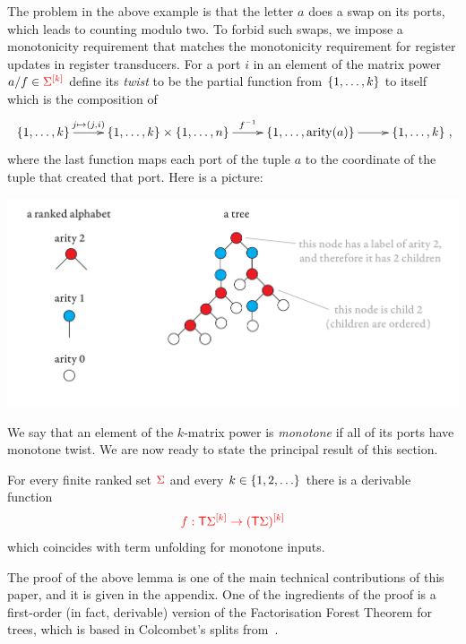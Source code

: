 The problem in the above example is that the letter $a$ does a swap on its ports, which leads to counting modulo two. To forbid such swaps, we impose a monotonicity requirement that matches the monotonicity requirement for register updates in register transducers.
For a port $i$ in an element of the matrix power $a/f \in \mati k \rSigma$ define its \emph{twist} to be the partial function from $\set{1,\ldots,k}$ to itself 
which is the composition of 
\begin{align*}
\xymatrix{
    \set{1,\ldots,k} \ar[r]^-{j \mapsto {(j,i)}} & \set{1,\ldots,k} \times \set{1,\ldots,n} \ar[r]^-{f^{-1}} & \set{1,\ldots,\arity a} \ar[r] & \set{1,\ldots,k}
},
\end{align*}
where the last function maps each port of the tuple $a$ to the coordinate of the tuple that created that port. Here is a picture:
\begin{center}
\includegraphics[scale=.3, page=87]{pics.pdf}
\end{center}
 We say that an element of the $k$-matrix power is \emph{monotone} if all of its ports have monotone twist.
 We are now ready to state the principal result of this section.

\begin{proposition}\label{prop:monotone-unfold}
    For every finite ranked set $\rSigma$ and every $k \in \set{1,2,\ldots}$ there is a derivable function 
    \begin{align*}
    \ranked{ f : \tmonad \mati k \Sigma \to \mati k {(\tmonad \Sigma)}}
    \end{align*}
    which coincides with term unfolding for monotone inputs.
\end{proposition}
The proof of the  above lemma is one of the main technical contributions of this paper, and it is given in the appendix. One of the ingredients of the proof is a first-order (in fact, derivable) version of the Factorisation Forest Theorem for trees, which is based in Colcombet's splits from~\cite{colcombetCombinatorialTheoremTrees2007}.  

